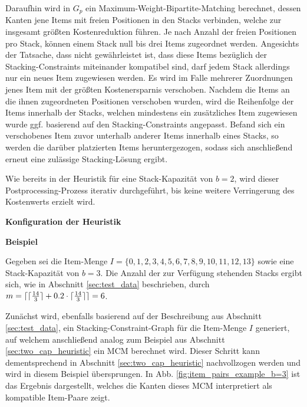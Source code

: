 Daraufhin wird in $G_p$ ein Maximum-Weight-Bipartite-Matching berechnet, dessen Kanten jene Items
mit freien Positionen in den Stacks verbinden, welche zur insgesamt größten Kostenreduktion führen.
Je nach Anzahl der freien Positionen pro Stack, können einem Stack null bis drei Items zugeordnet werden.
Angesichts der Tatsache, dass nicht gewährleistet ist, dass diese Items bezüglich der Stacking-Constraints miteinander kompatibel sind, darf jedem Stack allerdings nur ein neues Item zugewiesen werden.
Es wird im Falle mehrerer Zuordnungen jenes Item mit der größten Kostenersparnis verschoben.
Nachdem die Items an die ihnen zugeordneten Positionen verschoben wurden, wird die Reihenfolge der Items
innerhalb der Stacks, welchen mindestens ein zusätzliches Item zugewiesen wurde ggf. basierend auf den Stacking-Constraints angepasst. Befand sich ein verschobenes Item zuvor unterhalb anderer Items innerhalb eines Stacks, so werden die darüber platzierten Items heruntergezogen, sodass sich anschließend erneut eine zulässige Stacking-Lösung ergibt.

Wie bereits in der Heuristik für eine Stack-Kapazität von $b = 2$, wird dieser Postprocessing-Prozess
iterativ durchgeführt, bis keine weitere Verringerung des Kostenwerts erzielt wird.

\textbf{Konfiguration der Heuristik}

\vfill
\pagebreak

\textbf{Beispiel}

Gegeben sei die Item-Menge $I = \{0, 1, 2, 3, 4, 5, 6, 7, 8, 9, 10, 11, 12, 13\}$ sowie eine Stack-Kapazität von $b = 3$.
Die Anzahl der zur Verfügung stehenden Stacks ergibt sich, wie in Abschnitt \ref{sec:test_data} beschrieben,
durch $m = \lceil\lceil\frac{14}{3}\rceil + 0.2 \cdot  \lceil\frac{14}{3}\rceil\rceil = 6$.

Zunächst wird, ebenfalls basierend auf der Beschreibung aus Abschnitt \ref{sec:test_data}, ein Stacking-Constraint-Graph
für die Item-Menge $I$ generiert, auf welchem anschließend analog zum Beispiel aus Abschnitt \ref{sec:two_cap_heuristic} ein
\textsc{MCM} berechnet wird. Dieser Schritt kann dementsprechend in Abschnitt \ref{sec:two_cap_heuristic} nachvollzogen werden
und wird in diesem Beispiel übersprungen. In Abb. \ref{fig:item_pairs_example_b=3} ist das Ergebnis dargestellt,
welches die Kanten dieses \textsc{MCM} interpretiert als kompatible Item-Paare zeigt.

